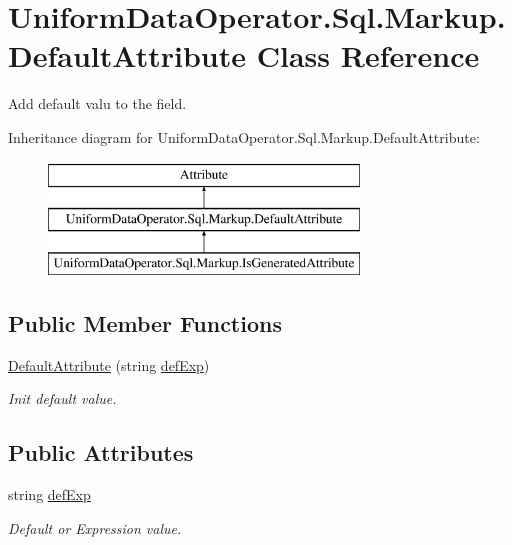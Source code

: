 \hypertarget{class_uniform_data_operator_1_1_sql_1_1_markup_1_1_default_attribute}{}\section{Uniform\+Data\+Operator.\+Sql.\+Markup.\+Default\+Attribute Class Reference}
\label{class_uniform_data_operator_1_1_sql_1_1_markup_1_1_default_attribute}


Add default valu to the field.  


Inheritance diagram for Uniform\+Data\+Operator.\+Sql.\+Markup.\+Default\+Attribute\+:\begin{figure}[H]
\begin{center}
\leavevmode
\includegraphics[height=3.000000cm]{d6/d7e/class_uniform_data_operator_1_1_sql_1_1_markup_1_1_default_attribute}
\end{center}
\end{figure}
\subsection*{Public Member Functions}
\begin{DoxyCompactItemize}
\item 
\mbox{\hyperlink{class_uniform_data_operator_1_1_sql_1_1_markup_1_1_default_attribute_ab6166dcaa64b5fecb183e6d946cd94b7}{Default\+Attribute}} (string \mbox{\hyperlink{class_uniform_data_operator_1_1_sql_1_1_markup_1_1_default_attribute_a64185e68bab327c41b4b7424ef88677b}{def\+Exp}})
\begin{DoxyCompactList}\small\item\em Init default value. \end{DoxyCompactList}\end{DoxyCompactItemize}
\subsection*{Public Attributes}
\begin{DoxyCompactItemize}
\item 
string \mbox{\hyperlink{class_uniform_data_operator_1_1_sql_1_1_markup_1_1_default_attribute_a64185e68bab327c41b4b7424ef88677b}{def\+Exp}}
\begin{DoxyCompactList}\small\item\em Default or Expression value. \end{DoxyCompactList}\end{DoxyCompactItemize}


